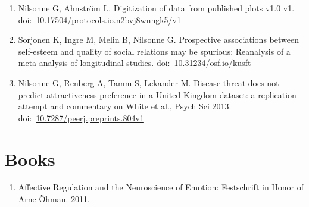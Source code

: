 \documentclass[10pt,a4paper,twocolumn]{article}
\begin{document}
\begin{enumerate}
    \item Nilsonne G, Ahnström L. Digitization of data from published plots v1.0 v1. doi:~\href{https://doi.org/10.17504/protocols.io.n2bvj8wnngk5/v1}{10.17504/protocols.io.n2bvj8wnngk5/v1}

    \item Sorjonen K, Ingre M, Melin B, Nilsonne G. Prospective associations between self-esteem and quality of social relations may be spurious: Reanalysis of a meta-analysis of longitudinal studies. doi:~\href{https://doi.org/10.31234/osf.io/kusft}{10.31234/osf.io/kusft}

    \item Nilsonne G, Renberg A, Tamm S, Lekander M. Disease threat does not predict attractiveness preference in a United Kingdom dataset: a replication attempt and commentary on White et al., Psych Sci 2013. doi:~\href{https://doi.org/10.7287/peerj.preprints.804v1}{10.7287/peerj.preprints.804v1}

\end{enumerate}



\section{Books}
\begin{enumerate}

    \item Affective Regulation and the Neuroscience of Emotion: Festschrift in Honor of Arne Öhman. 2011.

\end{enumerate}


\end{document}
